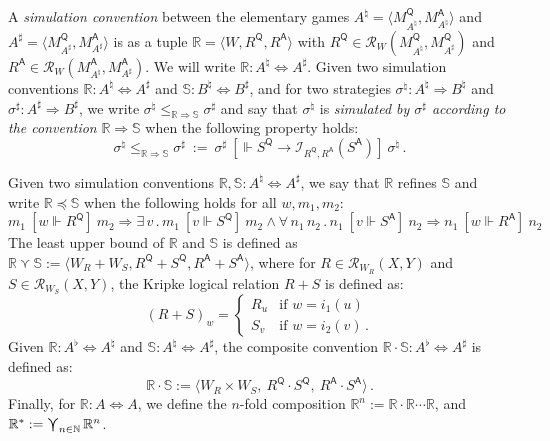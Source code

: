 \documentclass[acmsmall,timestamp,review,anonymous]{acmart}
\newcommand{\kw}[1]{\ensuremath{ \mathsf{#1} }}
\newcommand{\ifr}[1]{\ [{#1}]\ }
\begin{document}
\begin{definition} %
A \emph{simulation convention} between the elementary games
$A^\natural = \langle M_{A^\natural}^\kw{Q}, M_{A^\natural}^\kw{A} \rangle$ and
$A^\sharp = \langle M_{A^\sharp}^\kw{Q}, M_{A^\sharp}^\kw{A} \rangle$
is as a tuple $\mathbb{R} = \langle W, R^\kw{Q}, R^\kw{A} \rangle$
with $R^\kw{Q} \in \mathcal{R}_W(M_{A^\natural}^\kw{Q}, M_{A^\sharp}^\kw{Q})$
and $R^\kw{A} \in \mathcal{R}_W(M_{A^\natural}^\kw{A}, M_{A^\sharp}^\kw{A})$.
We will write $\mathbb{R} : A^\natural \Leftrightarrow A^\sharp$.
Given two simulation conventions
$\mathbb{R} : A^\natural \Leftrightarrow A^\sharp$ and
$\mathbb{S} : B^\natural \Leftrightarrow B^\sharp$,
and for two strategies
$\sigma^\natural : A^\natural \Rightarrow B^\natural$ and
$\sigma^\sharp : A^\sharp \Rightarrow B^\sharp$,
we write $\sigma^\natural \le_{\mathbb{R} \Rightarrow \mathbb{S}} \sigma^\sharp$
and say that $\sigma^\natural$ is
\emph{simulated by $\sigma^\sharp$ according to the convention}
$\mathbb{R} \Rightarrow \mathbb{S}$
when the following property holds:
\[
  \sigma^\natural \le_{\mathbb{R} \Rightarrow \mathbb{S}} \sigma^\sharp
  \: := \:
  \sigma^\sharp
  \ifr{\Vdash S^\kw{Q} \rightarrow
       \mathcal{I}_{R^\kw{Q}, R^\kw{A}}(S^\kw{A})}
  \sigma^\natural \,.
\]
\end{definition}

\begin{definition} %
Given two simulation conventions
$\mathbb{R}, \mathbb{S} : A^\natural \Leftrightarrow A^\sharp$,
we say that
$\mathbb{R}$ refines $\mathbb{S}$ and write
$\mathbb{R} \preceq \mathbb{S}$
when the following holds for all $w, m_1, m_2$:
\[
      m_1 \ifr{w \Vdash R^\kw{Q}} m_2 \Rightarrow
      \exists \, v \,.\,
        m_1 \ifr{v \Vdash S^\kw{Q}} m_2 \wedge
        \forall \, n_1 \, n_2 \,.\,
          n_1 \ifr{v \Vdash S^\kw{A}} n_2 \Rightarrow
          n_1 \ifr{w \Vdash R^\kw{A}} n_2
\]
The least upper bound of $\mathbb{R}$ and $\mathbb{S}$
is defined as
$
    \mathbb{R} \curlyvee \mathbb{S} :=
      \langle
        W_R + W_S,
        R^\kw{Q} + S^\kw{Q},
        R^\kw{A} + S^\kw{A}
      \rangle
$,
where for $R \in \mathcal{R}_{W_R}(X,Y)$
and $S \in \mathcal{R}_{W_S}(X,Y)$,
the Kripke logical relation $R + S$ is defined as:
\[
    (R + S)_w =
    \begin{cases}
      R_u & \mbox{if } w = i_1(u) \\
      S_v & \mbox{if } w = i_2(v) \,.
    \end{cases}
\]
Given
$\mathbb{R} : A^\flat \Leftrightarrow A^\natural$ and
$\mathbb{S} : A^\natural \Leftrightarrow A^\sharp$,
the composite convention
$\mathbb{R} \cdot \mathbb{S} : A^\flat \Leftrightarrow A^\sharp$ is defined as:
\[
    \mathbb{R} \cdot \mathbb{S} :=
      \langle
        W_R \times W_S, \:
        R^\kw{Q} \cdot S^\kw{Q}, \:
        R^\kw{A} \cdot S^\kw{A}
      \rangle \,.
\]
Finally,
for $\mathbb{R} : A \Leftrightarrow A$,
we define the $n$-fold composition
$\mathbb{R}^n := \mathbb{R} \cdot \mathbb{R} \cdots \mathbb{R}$,
and
$
    \mathbb{R}^* :=
      \bigcurlyvee_{n \in \mathbb{N}} \mathbb{R}^n
$.
\end{definition}
\end{document}
